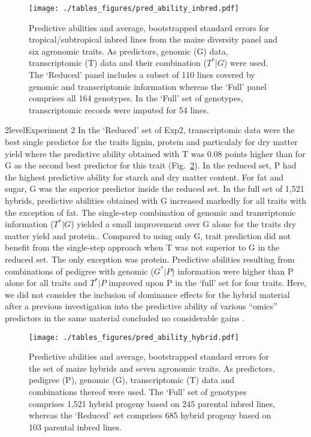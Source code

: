 \documentclass[12pt,titlepage]{article}
\begin{document}
\begin{figure}[H]
  \centering
  \texttt{[image: ./tables\_figures/pred\_ability\_inbred.pdf]}
  \caption{
  Predictive abilities and average, bootstrapped standard errors for
  tropical/subtropical inbred lines from the maize diversity panel and six
  agronomic traits.
  As predictors, genomic (G) data, transcriptomic (T) data and their 
  combination ($T^{*}|G$) were used.
  The `Reduced' panel includes a subset of 110 lines covered by genomic and
  transcriptomic information whereas the `Full' panel comprises all 164
  genotypes.
  In the `Full' set of genotypes, transcriptomic records were imputed for 54
  lines.
  }
\label{fig:InbredResults}
\end{figure}



\Genetics2level{Experiment 2}
In the `Reduced' set of Exp2, transcriptomic data were the best single predictor
for the traits lignin, protein and particulaly for dry matter yield where the
predictive ability obtained with T was 0.08 points higher than for G as the
second best predictor for this trait (Fig.~\ref{fig:HybridResults}).
In the reduced set, P had the highest predictive ability for starch and dry
matter content\@.
For fat and sugar, G was the superior predictor inside the reduced set.
In the full set of 1,521 hybrids, predictive abilities obtained with G increased
markedly for all traits with the exception of fat\@.
The single-step combination of genomic and transriptomic information
($T^{*}|G$) yielded a small improvement over G alone for the traits dry matter
yield and protein.\@.
Compared to using only G, trait prediction did not benefit from the single-step
approach when T was not superior to G in the reduced set.
The only exception was protein.
Predictive abilities resulting from combinations of pedigree with genomic
($G^{*}|P$) information were higher than P alone for all traits and $T^{*}|P$
improved upon P in the `full' set for four traits.
Here, we did not consider the inclusion of dominance effects for the hybrid
material after a previous investigation into the predictive ability of various
``omics'' predictors in the same material concluded no considerable gains 
\cite{Westhues2017}.

\begin{figure}[H]
\centering
  \texttt{[image: ./tables\_figures/pred\_ability\_hybrid.pdf]}
  \caption{
    Predictive abilities and average, bootstrapped standard errors for the set
    of maize hybrids and seven agronomic traits.
    As predictors, pedigree (P), genomic (G), transcriptomic (T) data and 
    combinations thereof were used.
    The `Full' set of genotypes comprises 1,521 hybrid progeny based on 245
    parental inbred lines, whereas the `Reduced' set comprises 685 hybrid
    progeny based on 103 parental inbred lines.
  }
\label{fig:HybridResults}
\end{figure}
\end{document}
